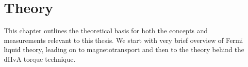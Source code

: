 \chapter{Theory}

This chapter outlines the theoretical basis for both the concepts and measurements relevant to this thesis. We start with very brief overview of Fermi liquid theory, leading on to magnetotransport and then to the theory behind the \ac{dHvA} torque technique.













